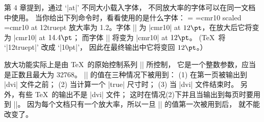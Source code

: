 \dangerexercise 第 4 章提到，通过 `|at|' 不同大小载入字体，
不同放大率的字体可以在同一文档中使用。%
当你给出下列命令时，看看使用的是什么字体：
\begintt
\magnification=
\font\first=cmr10 scaled
\font\second=cmr10 at 12truept
\endtt
\answer 放大率为 1.2。字体 |\first| 为 |cmr10|
at $12\pt$，在放大后它将变为 |cmr10| at $14.4\pt$；
而字体 |\second| 将变为 |cmr10| at $12\pt$。%
(\TeX\ 将 `|12truept|' 改成 `|10pt|'，
因此在最终输出中它将变回 $12\pt$。）

\ddanger 放大功能实际上是由 \TeX\ 的原始控制系列 |\mag| 所控制，
它是一个整数参数，应当是正数且最大为 32768。%
|\mag| 的值在三种情况下被用到：
(1) 在第一页被输出到 |dvi| 文件之前；
(2) 当计算一个 |true| 尺寸时；
(3) 当 |dvi| 文件结束时。%
另外，有些 \TeX\ 的输出不是 |dvi| 文件；
这时在情况(2)下并且当输出到每页时要用到 |\mag|。%
因为每个文档只有一个放大率，所以一旦 |\mag| 的值第一次被用到后，
就不能\hbox{改变了。}

